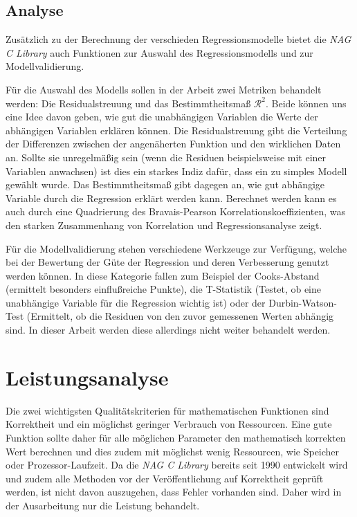 \documentclass{article}
\begin{document}
\subsection{Analyse}

Zusätzlich zu der Berechnung der verschieden Regressionsmodelle bietet die {\it NAG C Library} auch Funktionen zur Auswahl des Regressionsmodells und zur Modellvalidierung.

Für die Auswahl des Modells sollen in der Arbeit zwei Metriken behandelt werden: Die Residualstreuung und das Bestimmtheitsmaß $\mathcal{R}^2$.
Beide können uns eine Idee davon geben, wie gut die unabhängigen Variablen die Werte der abhängigen Variablen erklären können.
Die Residualstreuung gibt die Verteilung der Differenzen zwischen der angenäherten Funktion und den wirklichen Daten an.
Sollte sie unregelmäßig sein (wenn die Residuen beispielsweise mit einer Variablen anwachsen) ist dies ein starkes Indiz dafür, dass ein zu simples Modell gewählt wurde. 
Das Bestimmtheitsmaß gibt dagegen an, wie gut abhängige Variable durch die Regression erklärt werden kann.
Berechnet werden kann es auch durch eine Quadrierung des Bravais-Pearson Korrelationskoeffizienten, was den starken Zusammenhang von Korrelation und Regressionsanalyse zeigt.

Für die Modellvalidierung stehen verschiedene Werkzeuge zur Verfügung, welche bei der Bewertung der Güte der Regression und deren Verbesserung genutzt werden können.
In diese Kategorie fallen zum Beispiel der Cooks-Abstand (ermittelt besonders einflußreiche Punkte), die T-Statistik (Testet, ob eine unabhängige Variable für die Regression wichtig ist) oder der Durbin-Watson-Test (Ermittelt, ob die Residuen von den zuvor gemessenen Werten abhängig sind.
In dieser Arbeit werden diese allerdings nicht weiter behandelt werden.

\section{Leistungsanalyse}

Die zwei wichtigsten Qualitätskriterien für mathematischen Funktionen sind Korrektheit und ein möglichst geringer Verbrauch von Ressourcen.
Eine gute Funktion sollte daher für alle möglichen Parameter den mathematisch korrekten Wert berechnen und dies zudem mit möglichst wenig Ressourcen, wie Speicher oder Prozessor-Laufzeit.
Da die {\it NAG C Library} bereits seit 1990 entwickelt wird\cite{Wikipedia:nag} und zudem alle Methoden vor der Veröffentlichung auf Korrektheit geprüft werden\cite{NAG2011}, ist nicht davon auszugehen, dass Fehler vorhanden sind.
Daher wird in der Ausarbeitung nur die Leistung behandelt.
\end{document}
